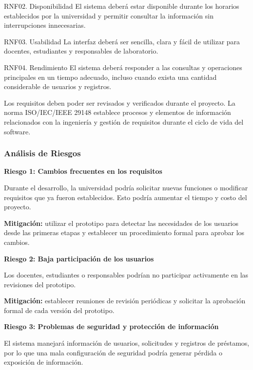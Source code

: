 \documentclass[pdflatex,sn-mathphys-num]{sn-jnl}%
\theoremstyle{thmstyleone}%
\theoremstyle{thmstyletwo}%
\theoremstyle{thmstylethree}%
\begin{document}
 		RNF02. Disponibilidad 
 		El sistema deberá estar disponible durante los horarios establecidos por la universidad y permitir consultar la información sin interrupciones innecesarias. 
 		
 		RNF03. Usabilidad 
 		La interfaz deberá ser sencilla, clara y fácil de utilizar para docentes, estudiantes y responsables de laboratorio. 
 		
 		RNF04. Rendimiento 
 		El sistema deberá responder a las consultas y operaciones principales en un tiempo adecuado, incluso cuando exista una cantidad considerable de usuarios y registros. 
 
 Los requisitos deben poder ser revisados y verificados durante el proyecto. La norma ISO/IEC/IEEE 29148 establece procesos y elementos de información relacionados con la ingeniería y gestión de requisitos durante el ciclo de vida del software.
 

 \subsubsection{Análisis de Riesgos }
 
 \textbf{Riesgo 1: Cambios frecuentes en los requisitos}
 
 Durante el desarrollo, la universidad podría solicitar nuevas funciones o modificar requisitos que ya fueron establecidos. Esto podría aumentar el tiempo y costo del proyecto.
 
 \textbf{Mitigación:} utilizar el prototipo para detectar las necesidades de los usuarios desde las primeras etapas y establecer un procedimiento formal para aprobar los cambios.
 
 \vspace{0.3cm}
 
 \textbf{Riesgo 2: Baja participación de los usuarios}
 
 Los docentes, estudiantes o responsables podrían no participar activamente en las revisiones del prototipo.
 
 \textbf{Mitigación:} establecer reuniones de revisión periódicas y solicitar la aprobación formal de cada versión del prototipo.
 
 \vspace{0.3cm}
 
 \textbf{Riesgo 3: Problemas de seguridad y protección de información}
 
 El sistema manejará información de usuarios, solicitudes y registros de préstamos, por lo que una mala configuración de seguridad podría generar pérdida o exposición de información.
 
\end{document}
